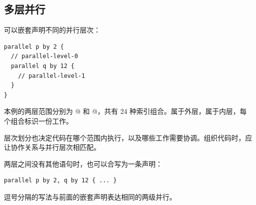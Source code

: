 \subsection*{多层并行}

可以嵌套声明不同的并行层次：

\begin{lstlisting}[language=croqtile,caption={嵌套的两级并行}]
parallel p by 2 {
  // parallel-level-0
  parallel q by 12 {
    // parallel-level-1
  }
}
\end{lstlisting}

本例的两层范围分别为 @ 和 @，共有 24 种索引组合。\co@p@ 属于外层，\co@q@ 属于内层，每个组合标识一份工作。

层次划分也决定代码在哪个范围内执行，以及哪些工作需要协调。组织代码时，应让协作关系与并行层次相匹配。

两层之间没有其他语句时，也可以合写为一条声明：

\begin{lstlisting}[language=croqtile,caption={合写的两级并行}]
parallel p by 2, q by 12 { ... }
\end{lstlisting}

逗号分隔的写法与前面的嵌套声明表达相同的两级并行。
